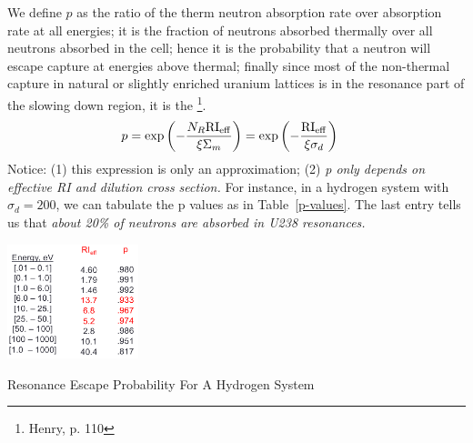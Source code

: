 \documentclass{school-22.211-notes}
\begin{document}
\clearpage
{}
We define $p$ as the ratio of the therm neutron absorption rate over absorption rate at all energies; it is the fraction of neutrons absorbed thermally over all neutrons absorbed in the cell; hence it is the probability that a neutron will escape capture at energies above thermal; finally since most of the non-thermal capture in natural or slightly enriched uranium lattices is in the resonance part of the slowing down region, it is the \footnote{Henry, p. 110}. 
\begin{align}
p &= \exp \left( - \frac{N_R \mathrm{RI}_{\mathrm{eff}}}{\xi \Sigma_m} \right)  = \exp \left( - \frac{\mathrm{RI}_{\mathrm{eff}}}{\xi \sigma_d} \right)
\end{align}
Notice: (1) this expression is only an approximation; (2) \textit{p only depends on effective RI and dilution cross section.} For instance, in a hydrogen system with $\sigma_d = 200$, we can tabulate the p values as in Table~\ref{p-values}. The last entry tells us that \textit{about 20\% of neutrons are absorbed in U238 resonances.}
\begin{table}
  \centering
  \includegraphics[width=1.5in]{images/r-m/resonance-escape-probability.png}
  \caption{Resonance Escape Probability For A Hydrogen System} \label{p-values}
\end{table}
\end{document}
